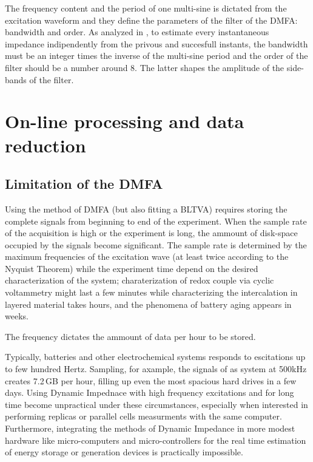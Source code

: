 The frequency content and the period of one multi-sine is dictated from the excitation waveform and they define the parameters of the filter of the DMFA: bandwidth and order.
As analyzed in \cite{chukwuStatisticalAnalysisMeasurement2022}, to estimate every instantaneous impedance indipendently from the privous and succesfull instants, the bandwidth must be an integer times the inverse of the multi-sine period and the order of the filter should be a number around 8. 
The latter shapes the amplitude of the side-bands of the filter.

\section{On-line processing and data reduction}
\label{On-line computation}

\subsection{Limitation of the DMFA}
Using the method of DMFA (but also fitting a BLTVA) requires storing the complete signals from beginning to end of the experiment.
When the sample rate of the acquisition is high or the experiment is long, the ammount of disk-space occupied by the signals become significant.
The sample rate is determined by the maximum frequencies of the excitation wave (at least twice according to the Nyquist Theorem) while the experiment time depend on the desired characterization of the system; charaterization of redox couple via cyclic voltammetry might last a few minutes while characterizing the intercalation in layered material takes hours, and the phenomena of battery aging appears in weeks.

The frequency dictates the ammount of data per hour to be stored.

Typically, batteries and other electrochemical systems responds to escitations up to few hundred Hertz.
Sampling, for axample, the signals of as system at 500kHz creates 7.2\,GB per hour, filling up even the most spacious hard drives in a few days.
Using Dynamic Impednace with high frequency excitations and for long time become unpractical under these circumstances, especially when interested in performing replicas or parallel cells measurments with the same computer.
Furthermore, integrating the methods of Dynamic Impedance in more modest hardware like micro-computers and micro-controllers for the real time estimation of energy storage or generation devices is practically impossible.

